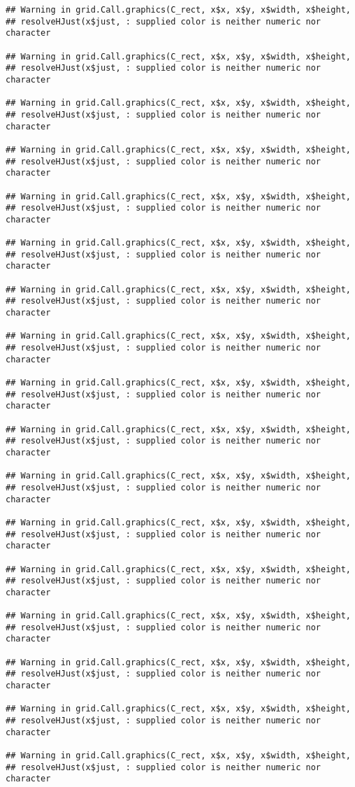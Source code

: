 \documentclass[
]{article}
\begin{document}
\begin{verbatim}
## Warning in grid.Call.graphics(C_rect, x$x, x$y, x$width, x$height,
## resolveHJust(x$just, : supplied color is neither numeric nor character

## Warning in grid.Call.graphics(C_rect, x$x, x$y, x$width, x$height,
## resolveHJust(x$just, : supplied color is neither numeric nor character

## Warning in grid.Call.graphics(C_rect, x$x, x$y, x$width, x$height,
## resolveHJust(x$just, : supplied color is neither numeric nor character

## Warning in grid.Call.graphics(C_rect, x$x, x$y, x$width, x$height,
## resolveHJust(x$just, : supplied color is neither numeric nor character

## Warning in grid.Call.graphics(C_rect, x$x, x$y, x$width, x$height,
## resolveHJust(x$just, : supplied color is neither numeric nor character

## Warning in grid.Call.graphics(C_rect, x$x, x$y, x$width, x$height,
## resolveHJust(x$just, : supplied color is neither numeric nor character

## Warning in grid.Call.graphics(C_rect, x$x, x$y, x$width, x$height,
## resolveHJust(x$just, : supplied color is neither numeric nor character

## Warning in grid.Call.graphics(C_rect, x$x, x$y, x$width, x$height,
## resolveHJust(x$just, : supplied color is neither numeric nor character

## Warning in grid.Call.graphics(C_rect, x$x, x$y, x$width, x$height,
## resolveHJust(x$just, : supplied color is neither numeric nor character

## Warning in grid.Call.graphics(C_rect, x$x, x$y, x$width, x$height,
## resolveHJust(x$just, : supplied color is neither numeric nor character

## Warning in grid.Call.graphics(C_rect, x$x, x$y, x$width, x$height,
## resolveHJust(x$just, : supplied color is neither numeric nor character

## Warning in grid.Call.graphics(C_rect, x$x, x$y, x$width, x$height,
## resolveHJust(x$just, : supplied color is neither numeric nor character

## Warning in grid.Call.graphics(C_rect, x$x, x$y, x$width, x$height,
## resolveHJust(x$just, : supplied color is neither numeric nor character

## Warning in grid.Call.graphics(C_rect, x$x, x$y, x$width, x$height,
## resolveHJust(x$just, : supplied color is neither numeric nor character

## Warning in grid.Call.graphics(C_rect, x$x, x$y, x$width, x$height,
## resolveHJust(x$just, : supplied color is neither numeric nor character

## Warning in grid.Call.graphics(C_rect, x$x, x$y, x$width, x$height,
## resolveHJust(x$just, : supplied color is neither numeric nor character

## Warning in grid.Call.graphics(C_rect, x$x, x$y, x$width, x$height,
## resolveHJust(x$just, : supplied color is neither numeric nor character
\end{verbatim}
\end{document}
